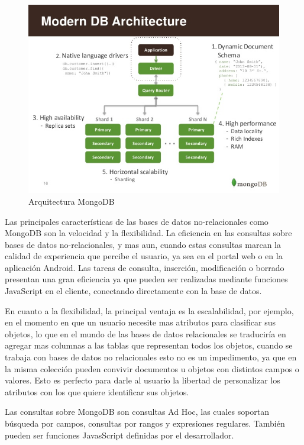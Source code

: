 \documentclass[a4paper,11pt]{book}
\begin{document}
\begin{figure}[H] 
\centering 
\includegraphics[scale=0.55]{imagenes/desarrollo_herramienta/mongo.jpg}
\caption{ Arquitectura MongoDB\cite{mongoA}  }  
\end{figure} 

Las principales características de las bases de datos no-relacionales como MongoDB son la velocidad y la flexibilidad. La eficiencia en las consultas sobre bases de datos no-relacionales, y mas aun, cuando estas consultas marcan la calidad de experiencia que percibe el usuario, ya sea en el portal web o en la aplicación Android.  Las tareas de consulta, inserción, modificación o borrado presentan una gran eficiencia ya que pueden ser realizadas mediante funciones JavaScript en el cliente, conectando directamente con la base de datos.

En cuanto a la flexibilidad, la principal ventaja es la escalabilidad, por ejemplo, en el momento en que un usuario necesite mas atributos para clasificar sus objetos, lo que en el mundo de las bases de datos relacionales se traduciría en agregar mas columnas a las tablas que representan todos los objetos, cuando se trabaja con bases de datos no relacionales esto no es un impedimento, ya que en la misma colección pueden convivir documentos u objetos con distintos campos o valores. Esto es perfecto para darle al usuario la libertad de personalizar los atributos con los que quiere identificar sus objetos.

Las consultas sobre MongoDB son consultas Ad Hoc, las cuales soportan búsqueda por campos, consultas por rangos y expresiones regulares. También pueden ser funciones JavasScript definidas por el desarrollador. 
\end{document}
